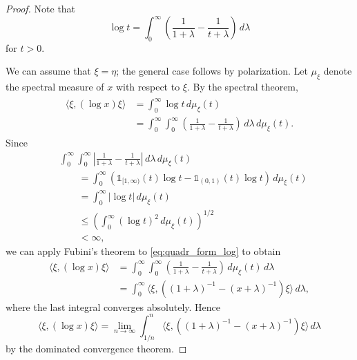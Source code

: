 \documentclass[12pt,a4paper]{amsart}
\newcommand{\1}{\mathds{1}}
\newcommand{\abs}[1]{\lvert#1\rvert}
\theoremstyle{plain}
\theoremstyle{definition}
\theoremstyle{remark}
\begin{document}
\begin{proof}
Note that
\begin{equation*}
\log t=\int_0^\infty\left(\frac 1 {1+\lambda}-\frac 1{t+\lambda}\right)\,d\lambda
\end{equation*}
for $t>0$.

We can assume that $\xi=\eta$; the general case follows by polarization. Let $\mu_\xi$ denote the spectral measure of $x$ with respect to $\xi$. By the spectral theorem,
\begin{align}
\begin{split}\label{eq:quadr_form_log}
\langle\xi,(\log x)\xi\rangle&=\int_0^\infty \log t\,d\mu_\xi(t)\\
&=\int_0^\infty\int_0^\infty\left(\frac 1{1+\lambda}-\frac 1{t+\lambda}\right)\,d\lambda\,d\mu_\xi(t).
\end{split}
\end{align}
Since
\begin{align*}
&\int_0^\infty\int_0^\infty \left\lvert\frac 1{1+\lambda}-\frac 1{t+\lambda}\right\rvert\,d\lambda\,d\mu_\xi(t)\\
&\qquad=\int_0^\infty (\1_{[1,\infty)}(t)\log t-\1_{(0,1)}(t)\log t)\,d\mu_\xi(t)\\
&\qquad=\int_0^\infty\abs{\log t}\,d\mu_\xi(t)\\
&\qquad\leq \left(\int_0^\infty(\log t)^2\,d\mu_\xi(t)\right)^{1/2}\\
&\qquad<\infty,
\end{align*}
we can apply Fubini's theorem to \eqref{eq:quadr_form_log} to obtain
\begin{align*}
\langle\xi,(\log x)\xi\rangle&=\int_0^\infty\int_0^\infty \left(\frac 1{1+\lambda}-\frac 1{t+\lambda}\right)\,d\mu_\xi(t)\,d\lambda\\
&=\int_0^\infty \langle\xi,((1+\lambda)^{-1}-(x+\lambda)^{-1})\xi\rangle\,d\lambda,
\end{align*}
where the last integral converges absolutely. Hence
\begin{equation*}
\langle \xi,(\log x)\xi\rangle=\lim_{n\to\infty}\int_{1/n}^n \langle \xi,((1+\lambda)^{-1}-(x+\lambda)^{-1})\xi\rangle\,d\lambda
\end{equation*}
by the dominated convergence theorem.
\end{proof}
\end{document}

